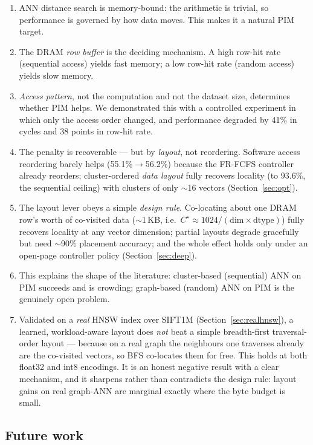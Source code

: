 \documentclass[11pt,a4paper]{article}
\begin{document}
\begin{enumerate}
\item ANN distance search is memory-bound: the arithmetic is trivial, so performance is governed by
how data moves. This makes it a natural PIM target.
\item The DRAM \emph{row buffer} is the deciding mechanism. A high row-hit rate (sequential access)
yields fast memory; a low row-hit rate (random access) yields slow memory.
\item \emph{Access pattern}, not the computation and not the dataset size, determines whether PIM
helps. We demonstrated this with a controlled experiment in which only the access order changed, and
performance degraded by 41\% in cycles and 38 points in row-hit rate.
\item The penalty is recoverable --- but by \emph{layout}, not reordering. Software access reordering
barely helps (55.1\%$\to$56.2\%) because the FR-FCFS controller already reorders; cluster-ordered
\emph{data layout} fully recovers locality (to 93.6\%, the sequential ceiling) with clusters of only
$\sim$16 vectors (Section~\ref{sec:opt}).
\item The layout lever obeys a simple \emph{design rule}. Co-locating about one DRAM row's worth of
co-visited data ($\sim$1\,KB, i.e.\ $C^\star\approx1024/(\mathrm{dim}\times\mathrm{dtype})$) fully
recovers locality at any vector dimension; partial layouts degrade gracefully but need $\sim$90\%
placement accuracy; and the whole effect holds only under an open-page controller policy
(Section~\ref{sec:deep}).
\item This explains the shape of the literature: cluster-based (sequential) ANN on PIM succeeds and
is crowding; graph-based (random) ANN on PIM is the genuinely open problem.
\item Validated on a \emph{real} HNSW index over SIFT1M (Section~\ref{sec:realhnsw}), a learned,
workload-aware layout does \emph{not} beat a simple breadth-first traversal-order layout --- because on
a real graph the neighbours one traverses already are the co-visited vectors, so BFS co-locates them
for free. This holds at both float32 and int8 encodings. It is an honest negative result with a clear
mechanism, and it sharpens rather than contradicts the design rule: layout gains on real graph-ANN are
marginal exactly where the byte budget is small.
\end{enumerate}

\subsection{Future work}
\end{document}
